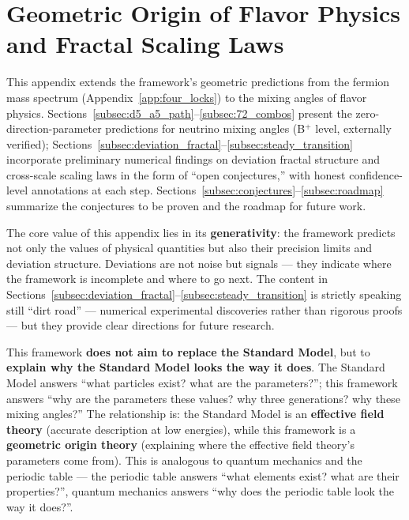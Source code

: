 
\section{Geometric Origin of Flavor Physics and Fractal Scaling Laws}
\label{app:flavor_geometry}

This appendix extends the framework's geometric predictions from the fermion mass spectrum (Appendix~\ref{app:four_locks}) to the mixing angles of flavor physics. Sections~\ref{subsec:d5_a5_path}--\ref{subsec:72_combos} present the zero-direction-parameter predictions for neutrino mixing angles (B$^+$ level, externally verified); Sections~\ref{subsec:deviation_fractal}--\ref{subsec:steady_transition} incorporate preliminary numerical findings on deviation fractal structure and cross-scale scaling laws in the form of ``open conjectures,'' with honest confidence-level annotations at each step. Sections~\ref{subsec:conjectures}--\ref{subsec:roadmap} summarize the conjectures to be proven and the roadmap for future work.

\begin{remark}
The core value of this appendix lies in its \textbf{generativity}: the framework predicts not only the values of physical quantities but also their precision limits and deviation structure. Deviations are not noise but signals --- they indicate where the framework is incomplete and where to go next. The content in Sections~\ref{subsec:deviation_fractal}--\ref{subsec:steady_transition} is strictly speaking still ``dirt road'' --- numerical experimental discoveries rather than rigorous proofs --- but they provide clear directions for future research.
\end{remark}

\begin{remark}
\label{rmk:sm_relation_en}
This framework \textbf{does not aim to replace the Standard Model}, but to \textbf{explain why the Standard Model looks the way it does}. The Standard Model answers ``what particles exist? what are the parameters?''; this framework answers ``why are the parameters these values? why three generations? why these mixing angles?'' The relationship is: the Standard Model is an \textbf{effective field theory} (accurate description at low energies), while this framework is a \textbf{geometric origin theory} (explaining where the effective field theory's parameters come from). This is analogous to quantum mechanics and the periodic table --- the periodic table answers ``what elements exist? what are their properties?'', quantum mechanics answers ``why does the periodic table look the way it does?''.
\end{remark}

